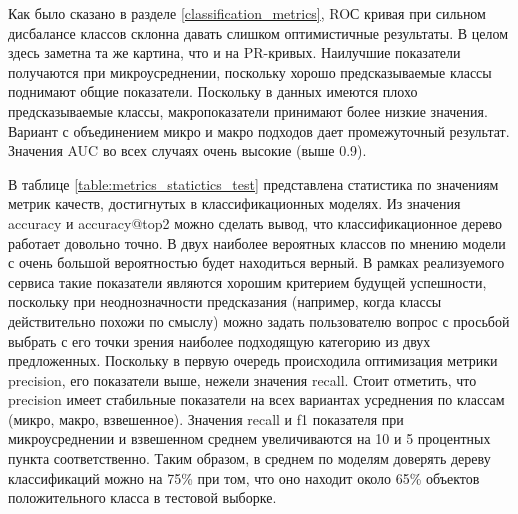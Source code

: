 \documentclass[a4paper,12pt]{extarticle}
\begin{document}
Как было сказано в разделе \ref{classification_metrics}, ROС кривая при сильном дисбалансе классов склонна давать слишком оптимистичные результаты. В целом здесь заметна та же картина, что и на PR-кривых. Наилучшие показатели получаются при микроусреднении, поскольку хорошо предсказываемые классы поднимают общие показатели. Поскольку в данных имеются плохо предсказываемые классы, макропоказатели принимают более низкие значения. Вариант с объединением микро и макро подходов дает промежуточный результат. Значения AUC во всех случаях очень высокие (выше 0.9).

В таблице \ref{table:metrics_statictics_test} представлена статистика по значениям метрик качеств, достигнутых в классификационных моделях. Из значения accuracy и accuracy@top2 можно сделать вывод, что классификационное дерево работает довольно точно. В двух наиболее вероятных классов по мнению модели с очень большой вероятностью будет находиться верный. В рамках реализуемого сервиса такие показатели являются хорошим критерием будущей успешности, поскольку при неоднозначности предсказания (например, когда классы действительно похожи по смыслу) можно задать пользователю вопрос с просьбой выбрать с его точки зрения наиболее подходящую категорию из двух предложенных. Поскольку в первую очередь происходила оптимизация метрики precision, его показатели выше, нежели значения recall. Стоит отметить, что precision имеет стабильные показатели на всех вариантах усреднения по классам (микро, макро, взвешенное). Значения recall и f1 показателя при микроусреднении и взвешенном среднем увеличиваются на 10 и 5 процентных пункта соответственно. Таким образом, в среднем по моделям доверять дереву классификаций можно на 75\% при том, что оно находит около 65\% объектов положительного класса в тестовой выборке.
\end{document}
